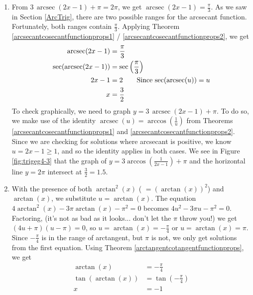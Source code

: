 {\begin{enumerate}
\item From $3 \, \operatorname{arcsec}(2x-1) + \pi = 2 \pi$, we get $\operatorname{arcsec}(2x-1) = \frac{\pi}{3}$.  As we saw in Section \ref{ArcTrig}, there are two possible ranges for the arcsecant function.  Fortunately, both ranges contain $\frac{\pi}{3}$.  Applying Theorem \ref{arcsecantcosecantfunctionprops1} / \ref{arcsecantcosecantfunctionprops2}, we get
\begin{align*}
\operatorname{arcsec}(2x-1)& =  \frac{\pi}{3}  \\
 \sec(\operatorname{arcsec}(2x-1)) & =  \sec\left(\frac{\pi}{3}\right)  \\ 
 2x -1 & =  2  \tag*{Since $\sec(\operatorname{arcsec}(u)) = u$} \\
    x & = \frac{3}{2}
\end{align*}
To check graphically, we need to graph $y=3 \, \operatorname{arcsec}(2x-1) + \pi$.  To do so, we make use of the identity $\operatorname{arcsec}(u) = \arccos\left(\frac{1}{u}\right)$ from Theorems \ref{arcsecantcosecantfunctionprops1} and \ref{arcsecantcosecantfunctionprops2}. Since we are checking for solutions where arcsecant is positive, we know $u = 2x-1 \geq 1$, and so the identity applies in both cases. We see in Figure \ref{fig:trigeg4-3} that the graph of $y=3 \arccos\left(\frac{1}{2x-1}\right) + \pi$ and the horizontal line $y = 2\pi$ intersect at $\frac{3}{2} = 1.5$.


\item  With the presence of both $\arctan^{2}(x)$ ( $= (\arctan(x))^2$) and $\arctan(x)$, we substitute $u = \arctan(x)$.  The equation  $4\arctan^2(x)-3\pi \arctan(x)-\pi^2 = 0$ becomes $4u^2 -3\pi u - \pi^2 = 0$.  Factoring, (it's not as bad as it looks...  don't let the $\pi$ throw you!) we get $(4u+\pi)(u - \pi) = 0$, so $u = \arctan(x) = -\frac{\pi}{4}$ or $u = \arctan(x) = \pi$.  Since $-\frac{\pi}{4}$ is in the range of arctangent, but $\pi$ is not, we only get solutions from the first equation.  Using Theorem \ref{arctangentcotangentfunctionprops}, we get
\begin{align*}
\arctan(x) & =  -\frac{\pi}{4} \\
\tan(\arctan(x)) & =  \tan\left(-\frac{\pi}{4}\right) \\
x & = -1  \tag*{Since $\tan(\arctan(u)) = u$.}
\end{align*}


\end{enumerate}}
